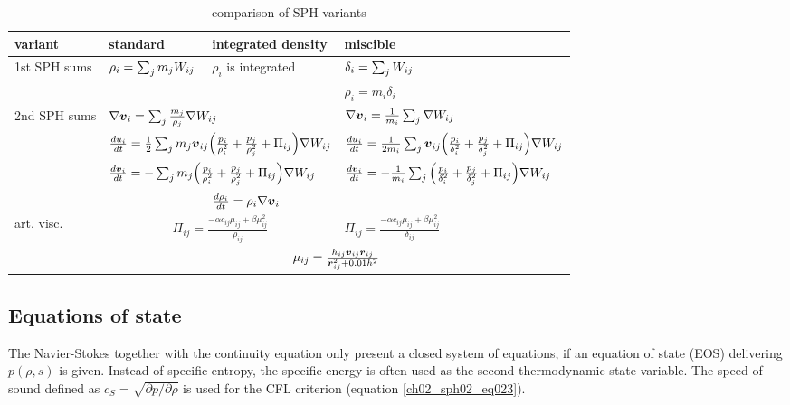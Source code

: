 \begin{table}[htdp]
\begin{center}
\begin{tabular}{|l|l|l|l|}
\hline
variant & standard  & integrated density & miscible \\
\hline \hline
\multirow{2}{1.5cm}{1st SPH sums} & 
\multirow{2}{1.5cm}{$\rho_i = \sum_{j} m_j W_{ij} $} & 
\multirow{2}{1.5cm}{$\rho_i$ is integrated }  & 
$ \delta_i = \sum_{j} W_{ij}$ \\
 &
 &
 & 
$\rho_i = m_i \delta_i $ \\
\hline
\multirow{4}{1.5cm}{2nd SPH sums} &
\multicolumn{2}{|l|}{$ \nabla \boldsymbol{v}_i = \sum_{j} \frac{m_j}{\rho_j} \nabla W_{ij} $} & 
$ \nabla \boldsymbol{v}_i = \frac{1}{m_i} \sum_{j} \nabla W_{ij} $ \\
& 
\multicolumn{2}{|l|}{$ \frac{du_i}{dt} = \frac{1}{2} \sum_{j} m_{j} \boldsymbol{v}_{ij} \Big( \frac{p_i}{\rho_i^2}  + \frac{p_j}{\rho_j^2} + \Pi_{ij} \Big) \nabla W_{ij} $} & 
$ \frac{du_i}{dt} = \frac{1}{2 m_i} \sum_{j} \boldsymbol{v}_{ij} \Big( \frac{p_i}{\delta_i^2}  + \frac{p_j}{\delta_j^2} + \Pi_{ij} \Big)  \nabla W_{ij} $ \\
& 
\multicolumn{2}{|l|}{$\frac{d \boldsymbol{v}_i }{dt} = - \sum_{j} m_j \Big( \frac{p_i}{\rho_i^2} + \frac{p_j}{\rho_j^2}  +\Pi_{ij} \Big) \nabla W_{ij}$} & 
$\frac{d \boldsymbol{v}_i }{dt} = - \frac{1}{m_i} \sum_{j} \Big( \frac{p_i}{\delta_i^2} + \frac{p_j}{\delta_j^2} + \Pi_{ij} \Big) \nabla W_{ij}$\\
&   
& 
$\frac{d \rho_i}{dt} = \rho_i \nabla \boldsymbol{v}_i$ & \\
\hline
art. visc. & \multicolumn{2}{|c|}{$\Pi_{ij} = \frac{- \alpha c_{ij} \mu_{ij} +  \beta \mu_{ij}^2 }{\rho_{ij} } $} & $\Pi_{ij} = \frac{- \alpha c_{ij} \mu_{ij} +  \beta \mu_{ij}^2 }{\delta_{ij} } $ \\
 & \multicolumn{3}{|c|}{$\mu_{ij} = \frac{h_{ij} \boldsymbol{v}_{ij} \boldsymbol{r}_{ij}}{\boldsymbol{r}_{ij}^2+ 0.01h^2} $} \\
\hline
\end{tabular}
\caption{comparison of SPH variants}
\end{center}
\label{ch02_sph01_tabl01}
\end{table}



\subsection{Equations of state}
The Navier-Stokes  together with the continuity equation only present a closed system of equations, if an equation of state (EOS) delivering $p(\rho, s)$ is given. Instead of specific entropy, the specific energy is often used as the second thermodynamic state variable. The speed of sound defined as $c_S = \sqrt{ \partial p / \partial \rho } $ is used for the CFL criterion (equation \ref{ch02_sph02_eq023}).

